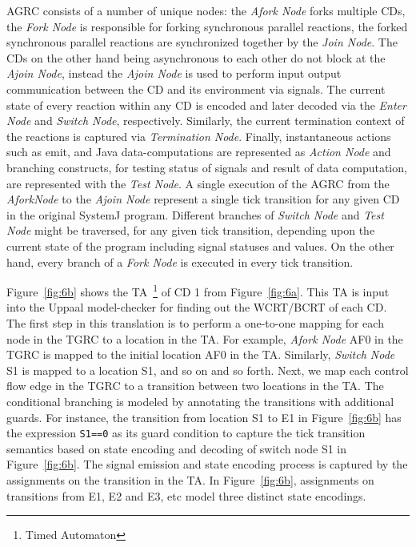 AGRC consists of a number of unique nodes: the \textit{Afork Node} forks
multiple CDs, the \textit{Fork Node} is responsible for forking
synchronous parallel reactions, the forked synchronous parallel
reactions are synchronized together by the \textit{Join Node}. The CDs
on the other hand being asynchronous to each other do not block at the
\textit{Ajoin Node}, instead the \textit{Ajoin Node} is used to perform
input output communication between the CD and its environment via
signals. The current state of every reaction within any CD is encoded
and later decoded via the \textit{Enter Node} and \textit{Switch Node},
respectively. Similarly, the current termination context of the
reactions is captured via \textit{Termination Node}. Finally,
instantaneous actions such as emit, and Java data-computations are
represented as \textit{Action Node} and branching constructs, for
testing status of signals and result of data computation, are
represented with the \textit{Test Node}. A single execution of the AGRC
from the \textit{AforkNode} to the \textit{Ajoin Node} represent a
single tick transition for any given CD in the original SystemJ program.
Different branches of \textit{Switch Node} and \textit{Test Node} might
be traversed, for any given tick transition, depending upon the current
state of the program including signal statuses and values. On the other
hand, every branch of a \textit{Fork Node} is executed in every tick
transition. %

Figure~\ref{fig:6b} shows the TA~\footnote{Timed Automaton} of CD 1 from
Figure~\ref{fig:6a}. This TA is input into the Uppaal model-checker for
finding out the WCRT/BCRT of each CD. The first step in this translation
is to perform a one-to-one mapping for each node in the TGRC to a
location in the TA. For example, \textit{Afork Node} AF0 in the TGRC is
mapped to the initial location AF0 in the TA. Similarly, \textit{Switch
  Node} S1 is mapped to a location S1, and so on and so forth. Next, we
map each control flow edge in the TGRC to a transition between two
locations in the TA. The conditional branching is modeled by annotating
the transitions with additional guards. For instance, the transition
from location S1 to E1 in Figure~\ref{fig:6b} has the expression
\texttt{S1==0} as its guard condition to capture the tick transition
semantics based on state encoding and decoding of switch node S1 in
Figure~\ref{fig:6b}. The signal emission and state encoding process is
captured by the assignments on the transition in the TA. In
Figure~\ref{fig:6b}, assignments on transitions from E1, E2 and E3, etc
model three distinct state encodings.

